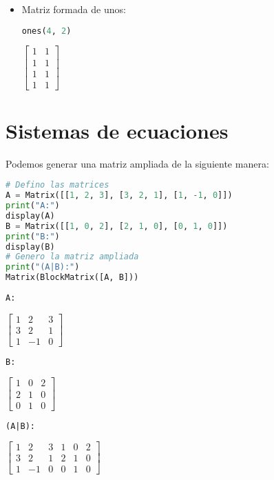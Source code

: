\documentclass[a4,11pt]{aleph-notas}
\begin{document}
\begin{itemize}
\item
    Matriz formada de unos:
\begin{pycodigo}
    \begin{ipynbcodigo}\begin{lstlisting}[language=Python]
ones(4, 2)
    \end{lstlisting}\end{ipynbcodigo}
    \begin{ipynbsalida}[2mm]
$\displaystyle \left[\begin{matrix}1 & 1\\1 & 1\\1 & 1\\1 & 1\end{matrix}\right]$
    \end{ipynbsalida}
\end{pycodigo}
\end{itemize}


\section{Sistemas de ecuaciones}

 Podemos generar una matriz ampliada de la siguiente manera:
\begin{pycodigo}
    \begin{ipynbcodigo}\begin{lstlisting}[language=Python]
# Defino las matrices
A = Matrix([[1, 2, 3], [3, 2, 1], [1, -1, 0]])
print("A:")
display(A)
B = Matrix([[1, 0, 2], [2, 1, 0], [0, 1, 0]])
print("B:")
display(B)
# Genero la matriz ampliada
print("(A|B):")
Matrix(BlockMatrix([A, B]))
    \end{lstlisting}\end{ipynbcodigo}
    \begin{ipynbsalida}
    \begin{Verbatim}
A:
    \end{Verbatim}
$\displaystyle \left[\begin{matrix}1 & 2 & 3\\3 & 2 & 1\\1 & -1 & 0\end{matrix}\right]$
    \begin{Verbatim}
B:
    \end{Verbatim}
$\displaystyle \left[\begin{matrix}1 & 0 & 2\\2 & 1 & 0\\0 & 1 & 0\end{matrix}\right]$

    \begin{Verbatim}
(A|B):
    \end{Verbatim}
$\displaystyle \left[\begin{matrix}1 & 2 & 3 & 1 & 0 & 2\\3 & 2 & 1 & 2 & 1 & 0\\1 & -1 & 0 & 0 & 1 & 0\end{matrix}\right]$
    \end{ipynbsalida}
\end{pycodigo}
\end{document}
